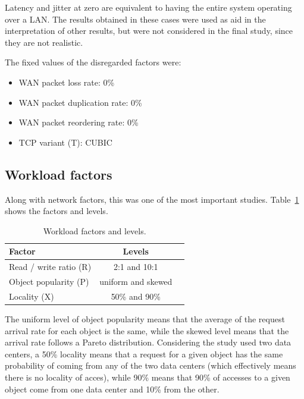 \documentclass[man,floatsintext,12pt]{apa6}
\begin{document}
Latency and jitter at zero are equivalent to having the entire system operating
over a LAN. The results obtained in these cases were used as aid in the
interpretation of other results, but were not considered in the final study,
since they are not realistic.

The fixed values of the disregarded factors were:

\begin{itemize}

\item WAN packet loss rate: 0\%

\item WAN packet duplication rate: 0\%

\item WAN packet reordering rate: 0\%

\item TCP variant (T): CUBIC

\end{itemize}

\subsection{Workload factors}

Along with network factors, this was one of the most important studies. Table~\ref{tab:workload_factors_and_levels} shows the factors and levels.

\begin{table}[h!]
\caption{Workload factors and levels.}
\label{tab:workload_factors_and_levels}
\begin{tabular}{lcc} \toprule

Factor & Levels \\ \midrule

Read / write ratio (R) & 2:1 and 10:1 \\

Object popularity (P) & uniform and skewed \\

Locality (X) & 50\% and 90\% \\ \bottomrule

\end{tabular}
\end{table}

The uniform level of object popularity means that the average of the request
arrival rate for each object is the same, while the skewed level means that the
arrival rate follows a Pareto distribution. Considering the study used two data
centers, a 50\% locality means that a request for a given object has the same
probability of coming from any of the two data centers (which effectively means
there is no locality of acces), while 90\% means that 90\% of accesses to a
given object come from one data center and 10\% from the other.
\end{document}
